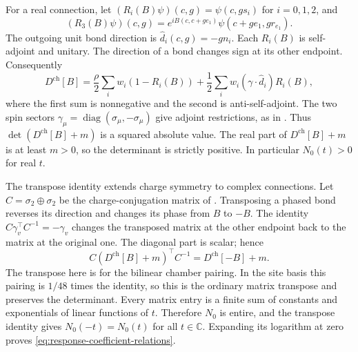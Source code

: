 \documentclass[11pt,letterpaper,reqno]{amsart}
\newcommand{\C}{\mathbb C}
\DeclareMathOperator{\diag}{diag}
\begin{document}
For a real connection, let
$(R_i(B)\psi)(c,g)=\psi(c,gs_i)$ for $i=0,1,2$, and
\[
 (R_3(B)\psi)(c,g)=e^{iB(c,c+ge_1)}
                         \psi(c+ge_1,gr_{e_1}).
\]
The outgoing unit bond direction is $\widehat d_i(c,g)=-gn_i$.
Each $R_i(B)$ is self-adjoint and unitary. The direction of a bond changes
sign at its other endpoint. Consequently
\[
 D^{\mathrm{ch}}[B]=\frac{\rho}{2}
       \sum_iw_i(1-R_i(B))+\frac12
       \sum_iw_i(\gamma\cdot\widehat d_i)R_i(B),
\]
where the first sum is nonnegative and the second is anti-self-adjoint.
The two spin sectors $\gamma_\mu=\diag(\sigma_\mu,-\sigma_\mu)$
give adjoint restrictions, as in \cite[(17)]{ChamberLattice}. Thus
$\det(D^{\mathrm{ch}}[B]+m)$ is a squared absolute value.
The real part of $D^{\mathrm{ch}}[B]+m$ is at least $m>0$,
so the determinant is strictly
positive. In particular $N_0(t)>0$ for real $t$.

The transpose identity extends charge symmetry to complex connections.
Let $C=\sigma_2\oplus\sigma_2$ be the charge-conjugation matrix of
\cite[\S3.1]{ChamberLattice}. Transposing a phased bond reverses its
direction and changes its phase from $B$ to $-B$.
The identity $C\gamma_v^\top C^{-1}=-\gamma_v$ changes the transposed
matrix at the other endpoint back to the matrix at the original one.
The diagonal part is scalar; hence
\[
 C(D^{\mathrm{ch}}[B]+m)^\top C^{-1}
                   =D^{\mathrm{ch}}[-B]+m.
\]
The transpose here is for the bilinear chamber pairing. In the site
basis this pairing is $1/48$ times the identity, so this is the
ordinary matrix transpose and preserves the determinant. Every matrix
entry is a finite sum of constants and exponentials of linear
functions of $t$. Therefore $N_0$ is entire, and the transpose
identity gives $N_0(-t)=N_0(t)$ for all $t\in\C$.
Expanding its logarithm at zero proves
\eqref{eq:response-coefficient-relations}.
\end{document}
